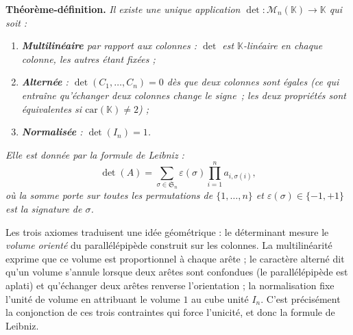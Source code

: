 ﻿%



\begin{tcolorbox}[thmbox]
  \textbf{Théorème-définition.}\enspace%
  \textit{Il existe une unique application
  $\det : \mathcal{M}_n(\mathbb{K}) \to \mathbb{K}$
  qui soit :}
  \begin{enumerate}
    \item \textit{\textbf{Multilinéaire} par rapport aux colonnes :
          $\det$ est $\mathbb{K}$-linéaire en chaque colonne, les autres étant fixées ;}
    \item \textit{\textbf{Alternée} : $\det(C_1,\ldots,C_n)=0$ dès que deux colonnes
          sont égales (ce qui entraîne qu'échanger deux colonnes change le signe~;
          les deux propriétés sont équivalentes si $\mathrm{car}(\mathbb{K}) \neq 2$) ;}
    \item \textit{\textbf{Normalisée} : $\det(I_n) = 1$.}
  \end{enumerate}
  \textit{Elle est donnée par la formule de Leibniz :}
  \[
    \det(A) = \sum_{\sigma \in \mathfrak{S}_n} \varepsilon(\sigma)
    \prod_{i=1}^{n} a_{i,\sigma(i)},
  \]
  \textit{où la somme porte sur toutes les permutations de $\{1,\ldots,n\}$
  et $\varepsilon(\sigma) \in \{-1,+1\}$ est la signature
  de $\sigma$.}
\end{tcolorbox}

\begin{significationintuitive}
  Les trois axiomes traduisent une idée géométrique : le déterminant mesure le
  \emph{volume orienté} du parallélépipède construit sur les colonnes. La
  multilinéarité exprime que ce volume est proportionnel à chaque arête ; le
  caractère alterné dit qu'un volume s'annule lorsque deux arêtes sont confondues
  (le parallélépipède est aplati) et qu'échanger deux arêtes renverse l'orientation ;
  la normalisation fixe l'unité de volume en attribuant le volume $1$ au cube unité
  $I_n$. C'est précisément la conjonction de ces trois contraintes qui force
  l'unicité, et donc la formule de Leibniz.
\end{significationintuitive}


